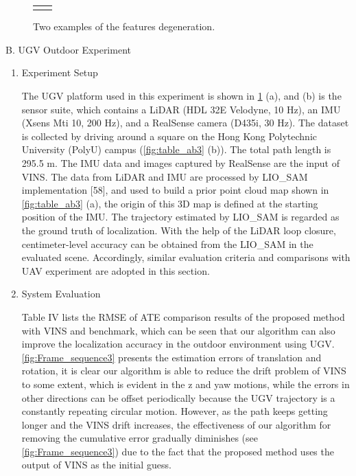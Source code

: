 \documentclass[10pt, letterpaper]{article}
\begin{document}
\begin{multicols*}{2}
\begin{figure}[H]
\begin{tabular}{cc}{}
    \end{tabular}
    \caption{Two examples of the features degeneration.}
    \label{fig:table_ab2}
\end{figure}

B. UGV Outdoor Experiment
\begin{enumerate}%
                \item  Experiment Setup

                
The UGV platform used in this experiment is shown in \cref{fig:table_ab2} (a), and (b) is the sensor suite, which contains a LiDAR
(HDL 32E Velodyne, 10 Hz), an IMU (Xsens Mti 10, 200 Hz),
and a RealSense camera (D435i, 30 Hz). The dataset is
collected by driving around a square on the Hong Kong
Polytechnic University (PolyU) campus (\cref{fig:table_ab3} (b)). The total
path length is 295.5 m. The IMU data and images captured by
RealSense are the input of VINS. The data from LiDAR and
IMU are processed by LIO\_SAM implementation [58], and
used to build a prior point cloud map shown in \cref{fig:table_ab3} (a), the
origin of this 3D map is defined at the starting position of the
IMU. The trajectory estimated by LIO\_SAM is regarded as the
ground truth of localization. With the help of the LiDAR loop
closure, centimeter-level accuracy can be obtained from the
LIO\_SAM in the evaluated scene. Accordingly, similar
evaluation criteria and comparisons with UAV experiment are
adopted in this section.
                \item System Evaluation


                Table IV lists the RMSE of ATE comparison results of the
proposed method with VINS and benchmark, which can be seen
that our algorithm can also improve the localization accuracy in
the outdoor environment using UGV. \cref{fig:Frame_sequence3} presents the
estimation errors of translation and rotation, it is clear our
algorithm is able to reduce the drift problem of VINS to some
extent, which is evident in the z and yaw motions, while the
errors in other directions can be offset periodically because the
UGV trajectory is a constantly repeating circular motion.
However, as the path keeps getting longer and the VINS drift
increases, the effectiveness of our algorithm for removing the
cumulative error gradually diminishes (see \cref{fig:Frame_sequence3}) due to the
fact that the proposed method uses the output of VINS as the
initial guess.


\end{enumerate}
\end{multicols*}
\end{document}
